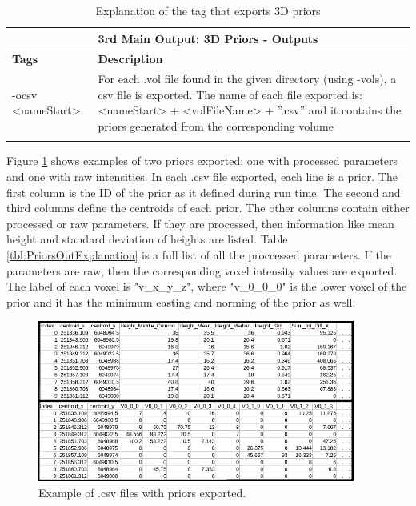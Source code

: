 \documentclass{article}
\begin{document}
			\newpage
				\begin{longtable}
					{|p{3.1cm}|p{11cm}|}
					\toprule
					\multicolumn{2}{|c|}{\textbf{3rd Main Output: 3D Priors  - Outputs }} \\
					\midrule
					\textbf{Tags} & \textbf{Description} \\ 
					\cmidrule(r){1-1}\cmidrule(l){2-2}
					-ocsv <nameStart> & For each .vol file found in the given directory (using -vols), a csv file is exported. The name of each file exported is:\newline <nameStart> + <volFileName> + ”.csv” \newline and it contains the priors generated from the corresponding volume \\
					\bottomrule
					\caption{Explanation of the tag that exports 3D priors}
					\label{tbl:PriorsOutputs}	
				\end{longtable}
	     Figure \ref{fig:PriorExample} shows examples of two priors exported: one with processed parameters and one with raw intensities. In each .csv file exported, each line is a prior. The first column is the ID of the prior as it defined during run time. The second and third columns define the centroids of each prior. The other columns contain either processed or raw parameters. If they are processed, then information like mean height and standard deviation of heights are listed. Table \ref{tbl:PriorsOutExplanation} is a full list of all the proccessed parameters. If the parameters are raw, then the corresponding voxel intensity values are exported. The label of each voxel is "v\_x\_y\_z", where "v\_0\_0\_0" is the lower voxel of the prior and it has the minimum easting and norming of the prior as well. 
	     	
	
	     \begin{figure} [h!]
	     	\centering
	     	\includegraphics[width=0.93\textwidth]{img/PriorsBoth}
	     	\caption{Example of .csv files with priors exported. }
	     	\label{fig:PriorExample}
	     \end{figure}		
	
\end{document}
